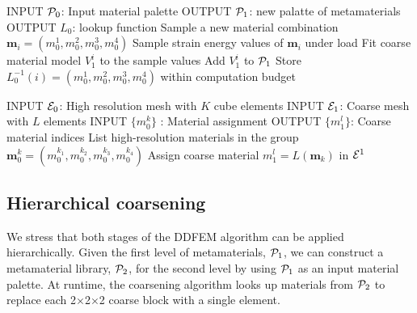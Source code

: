 	\begin{algorithmic}[1]
		\State INPUT $\mathcal{P}_0$: Input material palette
		\State OUTPUT $\mathcal{P}_1$: new palatte of metamaterials
		\State OUTPUT $L_0$: lookup function
        \Do
		\State Sample a new material combination $\mathbf{m}_i=(m_0^1,m_0^2,m_0^3,m_0^4)$
		\State Sample strain energy values of $\mathbf{m}_i$ under load
		\State Fit coarse material model $V_1^i$ to the sample values
		\State Add $V_1^i$ to $\mathcal{P}_1$
		\State Store $L_0^{-1}(i) = (m_0^1,m_0^2,m_0^3,m_0^4)$
		\doWhile within computation budget
		\EndProcedure
	\end{algorithmic}
\hrulefill
	\begin{algorithmic}[1]
		\State INPUT $\mathcal{E}_0$: High resolution mesh with $K$ cube elements
		\State INPUT $\mathcal{E}_1$: Coarse mesh with $L$ elements		
		\State INPUT $\{m_0^k\}$ : Material assignment
		\State OUTPUT $\{m_1^l\}$: Coarse material indices
		  \State List high-resolution materials in the group 
		  \State $\mathbf{m}_0^k = (m_0^{k_1},m_0^{k_2},m_0^{k_3},m_0^{k_4})$
		  \State Assign coarse material $m_1^l = L(\mathbf{m}_k)$ in $\mathcal{E}^1$
		\EndFor
		\EndProcedure
	\end{algorithmic}
\hrulefill

\subsection{Hierarchical coarsening}
We stress that both stages of the DDFEM algorithm can be applied hierarchically. Given the first level of metamaterials, $\mathcal{P}_1$, we can construct a metamaterial library, $\mathcal{P}_2$, for the second level by using $\mathcal{P}_1$ as an input material palette. At runtime, the coarsening algorithm looks up materials from $\mathcal{P}_2$ to replace each 2$\times$2$\times$2 coarse block with a single element.

